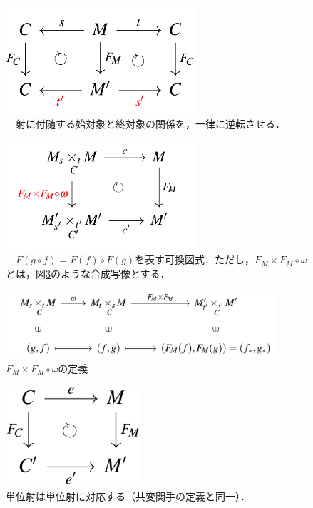 \documentclass[uplatex, 12pt, a4paper, dvipdfmx]{jsarticle}
\begin{document}
\begin{figure}[ht]\begin{center} \caption{\label{cd-8}　射に付随する始対象と終対象の関係を，一律に逆転させる．}
    \includegraphics[width=7cm]{cd-8.png}
\end{center}\end{figure}

\begin{figure}[ht]\begin{center} \caption{\label{cd-9}　$F(g\circ f)=F(f)\circ F(g)$を表す可換図式．ただし，$F_M\times F_M\circ\omega$とは，図\ref{cd-10}のような合成写像とする．}
    \includegraphics[width=7cm]{cd-9.png}
\end{center}\end{figure}

\begin{figure}[ht]\begin{center} \caption{\label{cd-10} $F_M\times F_M\circ\omega$の定義}\includegraphics[width=10cm]{cd-10.png} \end{center}\end{figure}

\begin{figure}[ht]\begin{center} \caption{単位射は単位射に対応する（共変関手の定義と同一）．}
    \includegraphics[width=5cm]{cd-7.png}
\end{center}\end{figure}
\end{document}
